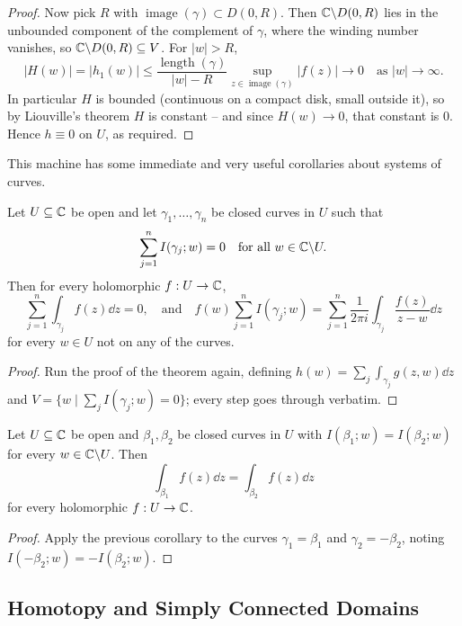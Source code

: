 \documentclass[a4paper]{scrartcl}
\begin{document}
\begin{proof}
    Now pick $R$ with $\operatorname{image}(\gamma) \subset D(0, R)$. Then $\mathbb{C} \backslash D(0, R)$ lies in the unbounded component of the complement of $\gamma$, where the winding number vanishes, so $\mathbb{C} \backslash D(0, R) \subseteq V$. For $|w| > R$,
    $$
    |H(w)| = |h_1(w)| \leq \frac{\operatorname{length}(\gamma)}{|w| - R}\sup_{z \in \operatorname{image}(\gamma)} |f(z)| \rightarrow 0 \quad \text{as } |w| \rightarrow \infty.
    $$
    In particular $H$ is bounded (continuous on a compact disk, small outside it), so by Liouville's theorem $H$ is constant -- and since $H(w) \rightarrow 0$, that constant is $0$. Hence $h \equiv 0$ on $U$, as required.
\end{proof}

This machine has some immediate and very useful corollaries about systems of curves.

\begin{corollary}
    Let $U \subseteq \mathbb{C}$ be open and let $\gamma_1, \dots, \gamma_n$ be closed curves in $U$ such that
    $$
    \sum_{j = 1}^n I(\gamma_j; w) = 0 \quad \text{for all } w \in \mathbb{C} \backslash U.
    $$
    Then for every holomorphic $f: U \rightarrow \mathbb{C}$,
    $$
    \sum_{j = 1}^n \int_{\gamma_j} f(z) \dd z = 0, \quad \text{and} \quad
    f(w)\sum_{j = 1}^n I(\gamma_j; w) = \sum_{j = 1}^n \frac{1}{2 \pi i}\int_{\gamma_j} \frac{f(z)}{z - w} \dd z
    $$
    for every $w \in U$ not on any of the curves.
\end{corollary}
\begin{proof}
    Run the proof of the theorem again, defining $h(w) = \sum_j \int_{\gamma_j} g(z, w) \dd z$ and $V = \{w \mid \sum_j I(\gamma_j; w) = 0\}$; every step goes through verbatim.
\end{proof}

\begin{corollary}
    Let $U \subseteq \mathbb{C}$ be open and $\beta_1, \beta_2$ be closed curves in $U$ with $I(\beta_1; w) = I(\beta_2; w)$ for every $w \in \mathbb{C} \backslash U$. Then
    $$
    \int_{\beta_1} f(z) \dd z = \int_{\beta_2} f(z) \dd z
    $$
    for every holomorphic $f: U \rightarrow \mathbb{C}$.
\end{corollary}
\begin{proof}
    Apply the previous corollary to the curves $\gamma_1 = \beta_1$ and $\gamma_2 = -\beta_2$, noting $I(-\beta_2; w) = -I(\beta_2; w)$.
\end{proof}

\subsection{Homotopy and Simply Connected Domains}
\end{document}
